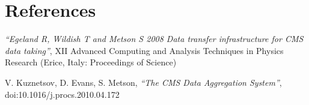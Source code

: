 \section*{References}

\begin{thebibliography}{1}
    {\it ``Egeland R, Wildish T and Metson S 2008 Data transfer infrastructure for CMS data taking''},  XII Advanced Computing and Analysis Techniques in Physics Research (Erice, Italy: Proceedings of Science)

 V. Kuznetsov, D. Evans, S. Metson,
{\it ``The CMS Data Aggregation System''},
doi:10.1016/j.procs.2010.04.172

\end{thebibliography}
